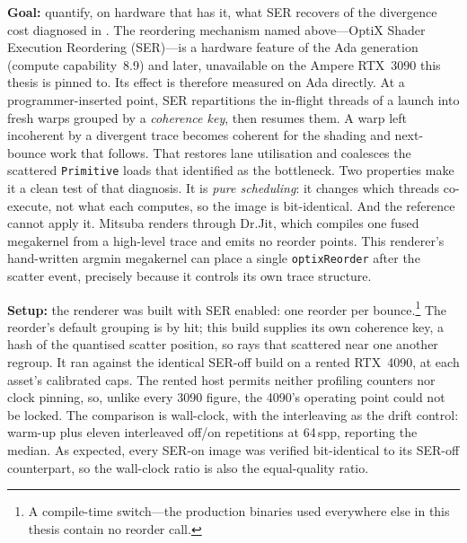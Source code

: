 \textbf{Goal:} quantify, on hardware that has it, what SER recovers of the divergence cost
diagnosed in .
The reordering mechanism named above---OptiX Shader Execution Reordering (SER)---is a hardware
feature of the Ada generation (compute capability~8.9) and later, unavailable on the Ampere
RTX~3090 this thesis is pinned to. Its effect is therefore measured on Ada directly. At a
programmer-inserted point, SER repartitions the in-flight threads of a launch into fresh warps grouped by a
\emph{coherence key}, then resumes them. A warp left incoherent by a divergent trace becomes coherent for the
shading and next-bounce work that follows. That restores lane utilisation and coalesces the scattered
\texttt{Primitive} loads that  identified as the bottleneck. Two properties make it a clean test of that diagnosis. It is \emph{pure scheduling}: it
changes which threads co-execute, not what each computes, so the image is bit-identical.
And the reference cannot apply it. Mitsuba
renders through Dr.Jit, which compiles one fused megakernel from a high-level trace and emits no reorder
points. This renderer's hand-written argmin megakernel can place a single \texttt{optixReorder}
after the scatter event, precisely because it controls its own trace structure.

\textbf{Setup:} the renderer was built with SER enabled: one reorder per bounce.\footnote{A
compile-time switch---the production binaries used everywhere
else in this thesis contain no reorder call.} The reorder's default grouping is by hit; this
build supplies its own coherence key, a hash of the quantised scatter position, so rays that
scattered near one another regroup. It ran against the identical SER-off build on a rented
RTX~4090, at each asset's
calibrated caps. The rented host permits neither profiling counters nor clock pinning, so, unlike
every \num{3090} figure, the 4090's operating point could not be locked. The comparison is
wall-clock, with the interleaving as the drift control: warm-up
plus eleven interleaved off/on repetitions at \num{64}\,spp, reporting the median. As expected,
every SER-on image was verified bit-identical to its SER-off counterpart, so the wall-clock
ratio is also the equal-quality ratio.

